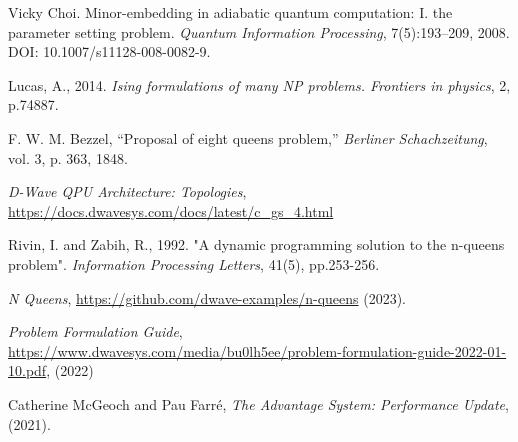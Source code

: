 \begin{thebibliography}{}
    Vicky Choi. Minor-embedding in adiabatic quantum computation: I. the parameter setting problem. \textit{Quantum Information Processing}, 7(5):193–209, 2008. DOI: 10.1007/s11128-008-0082-9.
  
    Lucas, A., 2014. 
    \textit{Ising formulations of many NP problems. Frontiers in physics}, 2, p.74887.
  
    F. W. M. Bezzel, “Proposal of eight queens problem,” \textit{Berliner Schachzeitung}, vol. 3, p. 363, 1848.
	
    \textit{D-Wave QPU Architecture: Topologies},
    \url{https://docs.dwavesys.com/docs/latest/c_gs_4.html}
    
    Rivin, I. and Zabih, R., 1992. "A dynamic programming solution to the n-queens problem". 
    \textit{Information Processing Letters}, 41(5), pp.253-256.
 
    \textit{N Queens}, \url{https://github.com/dwave-examples/n-queens} (2023).
 
    \textit{Problem Formulation Guide}, \url{https://www.dwavesys.com/media/bu0lh5ee/problem-formulation-guide-2022-01-10.pdf}, (2022)
   
    Catherine McGeoch and Pau Farré, 
    \textit{The Advantage System: Performance Update}, (2021).
   
 
\end{thebibliography}
